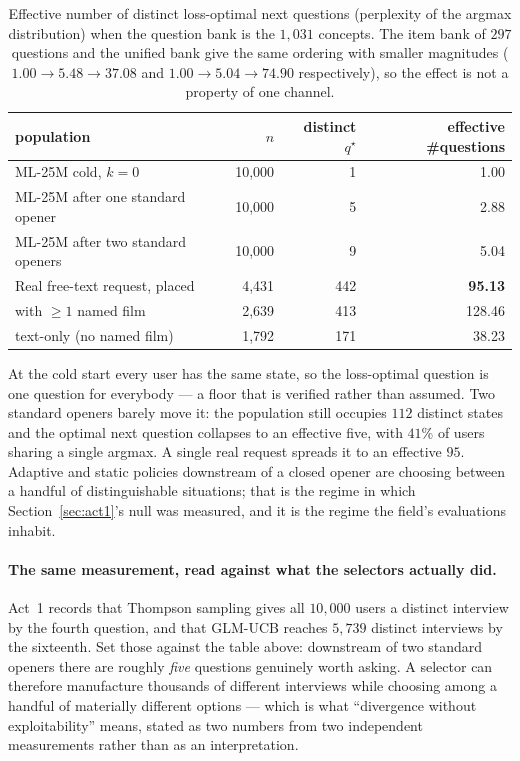 \documentclass[11pt]{article}
\begin{document}
\begin{table}[h]
\centering
\caption{Effective number of distinct loss-optimal next questions (perplexity of the argmax
distribution) when the question bank is the $1{,}031$ concepts. The item bank of $297$ questions and
the unified bank give the same ordering with smaller magnitudes ($1.00 \to 5.48 \to 37.08$ and
$1.00 \to 5.04 \to 74.90$ respectively), so the effect is not a property of one channel.}
\label{tab:dispersion}
\small
\begin{tabular}{lrrr}
\toprule
population & $n$ & distinct $q^\star$ & effective \#questions \\
\midrule
ML-25M cold, $k{=}0$ & 10{,}000 & 1 & 1.00 \\
ML-25M after one standard opener & 10{,}000 & 5 & 2.88 \\
ML-25M after two standard openers & 10{,}000 & 9 & 5.04 \\
Real free-text request, placed & 4{,}431 & 442 & \textbf{95.13} \\
\quad with $\geq 1$ named film & 2{,}639 & 413 & 128.46 \\
\quad text-only (no named film) & 1{,}792 & 171 & 38.23 \\
\bottomrule
\end{tabular}
\end{table}

At the cold start every user has the same state, so the loss-optimal question is one question for
everybody --- a floor that is verified rather than assumed. Two standard openers barely move it:
the population still occupies $112$ distinct states and the optimal next question collapses to an
effective five, with $41\%$ of users sharing a single argmax. A single real request spreads it to
an effective $95$. Adaptive and static policies downstream of a closed opener are choosing between
a handful of distinguishable situations; that is the regime in which Section~\ref{sec:act1}'s null was measured, and
it is the regime the field's evaluations inhabit.

\paragraph{The same measurement, read against what the selectors actually did.} Act~1 records that
Thompson sampling gives all $10{,}000$ users a distinct interview by the fourth question, and that
GLM-UCB reaches $5{,}739$ distinct interviews by the sixteenth. Set those against the table above:
downstream of two standard openers there are roughly \emph{five} questions genuinely worth asking.
A selector can therefore manufacture thousands of different interviews while choosing among a
handful of materially different options --- which is what ``divergence without exploitability''
means, stated as two numbers from two independent measurements rather than as an interpretation.
\end{document}
